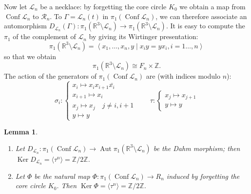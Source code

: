 \documentclass[11pt]{amsart}
\newtheorem{lemma}[theorem]{Lemma}
\begin{document}
Now let  $\mathcal{L}_n$ be a necklace: by forgetting 
the core circle $K_0$ we obtain a map from ${\mathop{\mathrm{Conf}}\nolimits} \mathcal{L}_n$ to $\mathcal{R}_n$.
To  $\Gamma = \mathcal{L}_n(t)$ in $\pi_1({\mathop{\mathrm{Conf}}\nolimits} \mathcal{L}_n)$,
we can therefore associate an automorphism 
$D_{\mathcal{L}_n}(\Gamma) : \pi_1({\mathbb{R}}^3\setminus \mathcal{L}_n) 
\to \pi_1({\mathbb{R}}^3\setminus \mathcal{L}_n)$.   It is easy to  compute the $\pi_1$ of the complement of $\mathcal{L}_n$ by giving its Wirtinger presentation:
$$\pi_1({\mathbb{R}}^3 \setminus \mathcal{L}_n) = \left\langle x_1,\ldots,x_n,y \mid x_iy=yx_i, i=1\ldots,n \right\rangle$$
so that we obtain
$$\pi_1({\mathbb{R}}^3 \setminus \mathcal{L}_n) \cong F_n \times {\mathbb{Z}}.$$
The action of the generators of $\pi_1({\mathop{\mathrm{Conf}}\nolimits} \mathcal{L}_n)$ are (with indices  modulo $n$):
$$\sigma_i : 
\left\{\begin{array}{l}
x_i \mapsto x_{i} x_{i+1} {\bar{{x_{i}}}} \\
x_{i+1} \mapsto x_i \\
x_{j} \mapsto x_j \quad j \neq i,i+1\\
y \mapsto y         
\end{array}\right.
\qquad 
\tau : 
\left\{\begin{array}{l}
x_j \mapsto x_{j+1} \\
y \mapsto y         
\end{array}\right.$$

\begin{lemma}
\label{lem:dahm}

\begin{enumerate}
\item Let  $D_{\mathcal{L}_n} : \pi_1({\mathop{\mathrm{Conf}}\nolimits} \mathcal{L}_n) \to {\mathop{\mathrm{Aut}}\nolimits}  \pi_1({\mathbb{R}}^3\setminus \mathcal{L}_n)$
be  the  Dahm morphism;
then ${\mathop{\mathrm{Ker}}\nolimits} D_{\mathcal{L}_n} = \langle \tau^n \rangle = {\mathbb{Z}} / 2{\mathbb{Z}}$.
\item Let $\Phi$ be the natural map $\Phi : \pi_1({\mathop{\mathrm{Conf}}\nolimits} \mathcal{L}_n) \to  R_n$ 
induced by forgetting the core circle $K_0$. Then ${\mathop{\mathrm{Ker}}\nolimits} \Phi = \langle \tau^n \rangle = {\mathbb{Z}}/ 2{\mathbb{Z}}$.
\end{enumerate}
\end{lemma}
\end{document}
